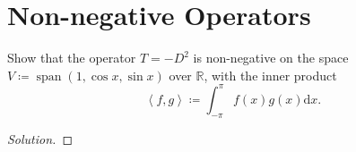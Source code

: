 \documentclass{article}
\newenvironment{solution}{\begin{proof}[Solution]}{\end{proof}}
\newcommand{\RR}{\mathbb{R}}
\DeclareMathOperator*{\vspan}{\mathrm{span}}
\newcommand{\innerproduct}[2]{\left\langle{#1}, {#2}\right\rangle}
\begin{document}
\section{Non-negative Operators}
\begin{hw}
	Show that the operator $T = -D^{2}$ is non-negative on the space $V \coloneq \vspan (1, \cos x, \sin x)$ over $\RR$, with the inner product
	\begin{equation*}
		\innerproduct{f}{g} \coloneq \int_{-\pi}^{\pi} f(x)g(x) \mathrm dx.
	\end{equation*}
\end{hw}
\begin{solution}
	\begin{comment}
		First, we want to show that $T$ is indeed self-adjoint. To do this, we first recall that all $f \in V$ have the property that $f(\pi) = f(-\pi)$. Furthermore, note that since differentiation of $f \in V$ results in a new vector $Df \in V$ as well, we note then that it will also have the same property. Now, with this in mind, we see that
	\begin{align*}
		\innerproduct{Tf}{g} &= \int_{-\pi}^{\pi} -f''(x)g(x) \mathrm dx \\
		&= -\int_{-\pi}^{\pi} f''(x)g(x)\mathrm dx \\
		&= -\left(f'(x)g(x)\big|_{-\pi}^{\pi} - \int_{-\pi}^{\pi} g'(x)f'(x)\mathrm dx\right) \\
		&= \int_{-\pi}^{\pi} g'(x)f'(x) \mathrm dx \\
		&= f(x)g'(x)\big|_{-\pi}^{\pi} - \int_{-\pi}^{\pi} f(x)g''(x) \mathrm dx \\
		&= \int_{-\pi}^{\pi} f(x)(-g''(x)) \mathrm dx \\
		&= \innerproduct{f}{Tg}.
	\end{align*}

	Next, we want to show that $\innerproduct{Tf}{g} \geq 0$ for all $f,g \in V$. First, we make the following observation:
	\begin{align*}
		-(\sin x)'' &= \sin x \\
		-(\cos x)'' &= \cos x \\
		-(1)'' &= 0
	\end{align*}

	In other words, for $f = \cos x$ or $\sin x$, we see that $Tf = f$. Next, we recall that since $1, \cos x, \sin x$ are all orthogonal to each other with respect to the given inner product above, it follows then that the their inner products must be equal to zero. Thus, we have to consider the following three cases:
	\begin{enumerate}
		\item $\innerproduct{T(1)}{1}$,
		\item $\innerproduct{T(\sin x)}{\sin x}$,
		\item $\innerproduct{T(\cos x)}{\cos x}$.
	\end{enumerate}


\end{comment}
\end{solution}
\end{document}
